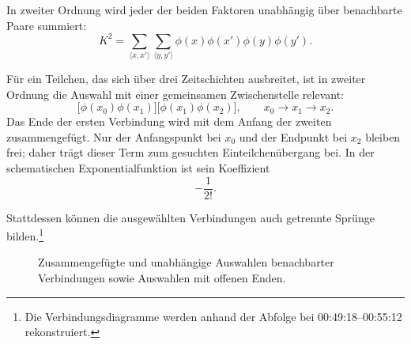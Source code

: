 In zweiter Ordnung wird jeder der beiden Faktoren unabhängig über benachbarte Paare summiert:
\begin{equation}
K^2
=
\sum_{\langle x,x'\rangle}
\sum_{\langle y,y'\rangle}
\phi(x)\phi(x')\phi(y)\phi(y').
\end{equation}

\begin{classroomqa}
\end{classroomqa}

Für ein Teilchen, das sich über drei Zeitschichten ausbreitet, ist in zweiter Ordnung die Auswahl mit einer gemeinsamen Zwischenstelle relevant:
\begin{equation}
\bigl[\phi(x_0)\phi(x_1)\bigr]
\bigl[\phi(x_1)\phi(x_2)\bigr],
\qquad
x_0\longrightarrow x_1\longrightarrow x_2.
\end{equation}
Das Ende der ersten Verbindung wird mit dem Anfang der zweiten zusammengefügt. Nur der Anfangspunkt bei \(x_0\) und der Endpunkt bei \(x_2\) bleiben frei; daher trägt dieser Term zum gesuchten Einteilchenübergang bei. In der schematischen Exponentialfunktion ist sein Koeffizient
\begin{equation}
-\frac{1}{2!}.
\end{equation}

Stattdessen können die ausgewählten Verbindungen auch getrennte Sprünge bilden.\footnote{Die Verbindungsdiagramme werden anhand der Abfolge bei 00:49:18--00:55:12 rekonstruiert.}
\begin{figure}[htbp]
\centering
{}
\caption{Zusammengefügte und unabhängige Auswahlen benachbarter Verbindungen sowie Auswahlen mit offenen Enden.}
\end{figure}

